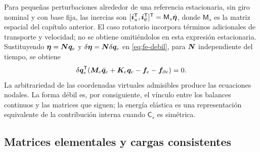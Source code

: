 Para pequeñas perturbaciones alrededor de una referencia estacionaria, sin
giro nominal y con base fija, las inercias son
$[\bm{i}_u^{\mathsf T},\bm{i}_\theta^{\mathsf T}]^{\mathsf T}
=\mathsf M_s\ddot{\bm{\eta}}$, donde $\mathsf M_s$ es la matriz espacial del
capítulo anterior. El caso rotatorio incorpora términos adicionales de
transporte y velocidad; no se obtiene omitiéndolos en esta expresión
estacionaria. Sustituyendo $\bm{\eta}=\boldsymbol{N}\bm{q}_e$ y
$\delta\bm{\eta}=\boldsymbol{N}\delta\bm{q}_e$ en \eqref{eq:fe-debil}, para
$\boldsymbol{N}$ independiente del tiempo, se obtiene
\begin{equation}
 \delta\bm{q}_e^{\mathsf T}
 (\boldsymbol{M}_e\ddot{\bm{q}}_e+\boldsymbol{K}_e\bm{q}_e
       -\bm{f}_e-\bm{f}_{\partial e})=0.
\end{equation}
La arbitrariedad de las coordenadas virtuales admisibles produce las
ecuaciones nodales. La forma débil es, por consiguiente, el vínculo entre los
balances continuos y las matrices que siguen; la energía elástica es una
representación equivalente de la contribución interna cuando
$\mathsf C_s$ es simétrica.

\subsection{Matrices elementales y cargas consistentes}

